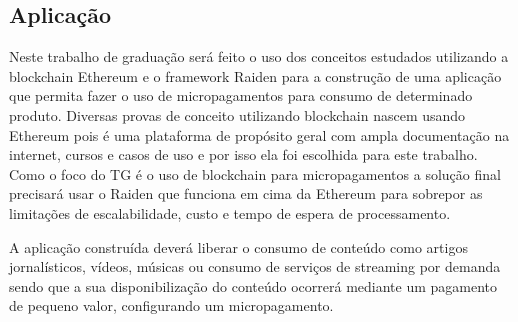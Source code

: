 \documentclass[12pt]{article}
\begin{document}
\subsection{Aplicação}

Neste trabalho de graduação será feito o uso dos conceitos estudados utilizando a blockchain Ethereum e o framework Raiden para a construção de uma aplicação que permita fazer o uso de micropagamentos para consumo de determinado produto. Diversas provas de conceito utilizando blockchain nascem usando Ethereum pois é uma plataforma de propósito geral com ampla documentação na internet, cursos e casos de uso e por isso ela foi escolhida para este trabalho. Como o foco do TG é o uso de blockchain para micropagamentos a solução final precisará usar o Raiden que funciona em cima da Ethereum para sobrepor as limitações de escalabilidade, custo e tempo de espera de processamento. 

A aplicação construída deverá liberar o consumo de conteúdo como artigos jornalísticos, vídeos, músicas ou consumo de serviços de streaming por demanda sendo que a sua disponibilização do conteúdo ocorrerá mediante um pagamento de pequeno valor, configurando um micropagamento.

\singlespacing
\newpage
\printbibliography
\end{document}
